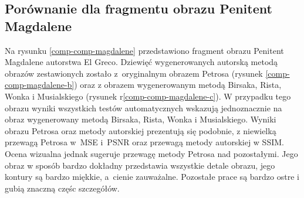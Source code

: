         \subsection{Porównanie dla fragmentu obrazu Penitent Magdalene}
    	Na rysunku \ref{comp-comp-magdalene} przedstawiono fragment obrazu Penitent Magdalene autorstwa El Greco. Dziewięć wygenerowanych autorską metodą obrazów zestawionych zostało z~oryginalnym obrazem Petrosa (rysunek \ref{comp-comp-magdalene-b}) oraz z obrazem wygenerowanym metodą Birsaka, Rista, Wonka i Musialskiego (rysunek r\ref{comp-comp-magdalene-c}). W przypadku tego obrazu wyniki wszystkich testów automatycznych wskazują jednoznacznie na obraz wygenerowany metodą Birsaka, Rista, Wonka i Musialskiego. Wyniki obrazu Petrosa oraz metody autorskiej prezentują się podobnie, z niewielką przewagą Petrosa w~MSE i~PSNR oraz przewagą metody autorskiej w SSIM. Ocena wizualna jednak sugeruje przewagę metody Petrosa nad pozostałymi. Jego obraz w sposób bardzo dokładny przedstawia wszystkie detale obrazu, jego kontury są bardzo miękkie, a~cienie zauważalne. Pozostałe prace są bardzo ostre i gubią znaczną częśc szczegółów. 
    	\newpage
    	

